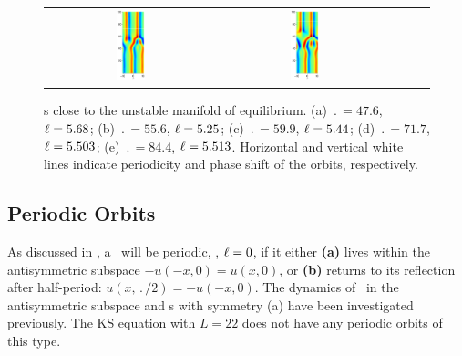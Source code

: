 \begin{figure}[t]
\begin{center}
\begin{tabular}{ccccc}
\includegraphics[width=0.18\textwidth]{figs/ks22rpo071.7-05.50.eps}\hspace{-3ex} &
\includegraphics[width=0.18\textwidth]{figs/ks22rpo084.4-05.51.eps}
\end{tabular}
\end{center}
\caption{\Rpo s close to the unstable manifold of  equilibrium.
(a) $\period{} = 47.6$, $\ell = 5.68$;
(b) $\period{} = 55.6$, $\ell = 5.25$;
(c) $\period{} = 59.9$, $\ell = 5.44$;
(d) $\period{} = 71.7$, $\ell = 5.503$;
(e) $\period{} = 84.4$, $\ell = 5.513$.
Horizontal and vertical white lines indicate periodicity and
phase shift of the orbits, respectively. }\label{f:ks22rposCage}
\end{figure}


\subsection{Periodic Orbits} \label{ssec:po}
As discussed in , a \rpo\ will be periodic, \ie,
$\ell = 0$, if it either {\bf (a)} lives within the antisymmetric
subspace $-u(-x,0) = u(x,0)$, or {\bf (b)} returns to its reflection
after half-period: $u(x,\period{}/2)=-u(-x,0)$.  The dynamics of
\KSe\ in the antisymmetric subspace and \po s with symmetry (a) have
been investigated
previously. The KS equation
with $L = 22$ does not have any periodic orbits of this type.

